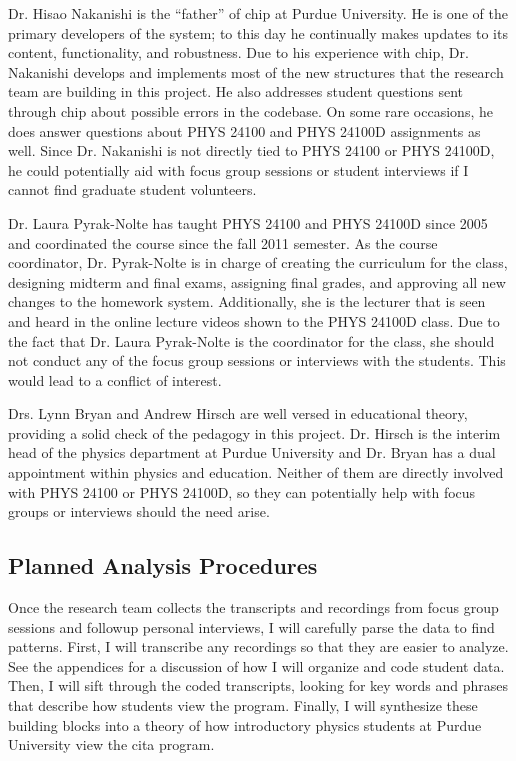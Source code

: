 Dr. Hisao Nakanishi is the ``father'' of \gls{chip} at Purdue University. He is one of the primary developers of the system; to this day he continually makes updates to its content, functionality, and robustness. Due to his experience with \gls{chip}, Dr. Nakanishi develops and implements most of the new structures that the research team are building in this project. He also addresses student questions sent through \gls{chip} about possible errors in the codebase. On some rare occasions, he does answer questions about PHYS 24100 and PHYS 24100D assignments as well. Since Dr. Nakanishi is not directly tied to PHYS 24100 or PHYS 24100D, he could potentially aid with focus group sessions or student interviews if I cannot find graduate student volunteers.

Dr. Laura Pyrak-Nolte has taught PHYS 24100 and PHYS 24100D since 2005 and coordinated the course since the fall 2011 semester. As the course coordinator, Dr. Pyrak-Nolte is in charge of creating the curriculum for the class, designing midterm and final exams, assigning final grades, and approving all new changes to the homework system. Additionally, she is the lecturer that is seen and heard in the online lecture videos shown to the PHYS 24100D class. Due to the fact that Dr. Laura Pyrak-Nolte is the coordinator for the class, she should not conduct any of the focus group sessions or interviews with the students. This would lead to a conflict of interest.

Drs. Lynn Bryan and Andrew Hirsch are well versed in educational theory, providing a solid check of the pedagogy in this project. Dr. Hirsch is the interim head of the physics department at Purdue University and Dr. Bryan has a dual appointment within physics and education. Neither of them are directly involved with PHYS 24100 or PHYS 24100D, so they can potentially help with focus groups or interviews should the need arise.

\subsection{Planned Analysis Procedures}

Once the research team collects the transcripts and recordings from focus group sessions and followup personal interviews, I will carefully parse the data to find patterns. First, I will transcribe any recordings so that they are easier to analyze. See the appendices for a discussion of how I will organize and code student data. Then, I will sift through the coded transcripts, looking for key words and phrases that describe how students view the program. Finally, I will synthesize these building blocks into a theory of how introductory physics students at Purdue University view the \gls{cita} program.

